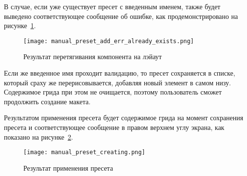 \pagebreak
В случае, если уже существует пресет с введенным именем, также будет выведено соответствующее сообщение об ошибке, как продемонстрировано на рисунке~\ref{sec:manual:manual_preset_add_err_already_exists}.

\begin{figure}[ht]
  \centering
    \texttt{[image: manual\_preset\_add\_err\_already\_exists.png]}
    \caption{Результат перетягивания компонента на лэйаут}
    \label{sec:manual:manual_preset_add_err_already_exists}
\end{figure}

Если же введенное имя проходит валидацию, то пресет сохраняется в списке, который сраху же перерисовывается, добавляя новый элемент в самом низу. Содержимое грида при этом не очищается, поэтому пользователь сможет продолжить создание макета.

Результатом применения пресета будет содержимое грида на момент сохранения пресета и соответствующее сообщение в правом верхнем углу экрана, как показано на рисунке~\ref{sec:manual:manual_preset_creating}.

\begin{figure}[ht]
  \centering
    \texttt{[image: manual\_preset\_creating.png]}
    \caption{Результат применения пресета}
    \label{sec:manual:manual_preset_creating}
\end{figure}

